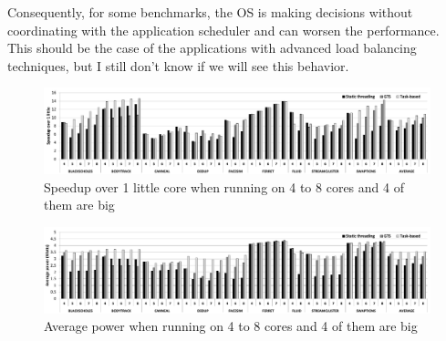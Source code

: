 Consequently, for some benchmarks, the OS is making decisions without coordinating with the application scheduler and can worsen the performance. This should be the case of the applications with advanced load balancing techniques, but I still don't know if we will see this behavior.
\fi
\begin{figure}[t]%
	\centering
	\includegraphics[width=1.0\textwidth]{figures/speedup-4plus.pdf}
	\vspace{-0.5cm}
	\caption{Speedup over 1 little core when running on 4 to 8 cores and 4 of them are big}
	\label{fig:speedup4plus}%
	\vspace{-0.3cm}
\end{figure}

\begin{figure}[t]%
	\centering
	\includegraphics[width=1.0\textwidth]{figures/power4plus.pdf}
	\vspace{-0.5cm}
	\caption{Average power when running on 4 to 8 cores and 4 of them are big}
	\label{fig:power4plus}%
	\vspace{-0.3cm}
\end{figure}


